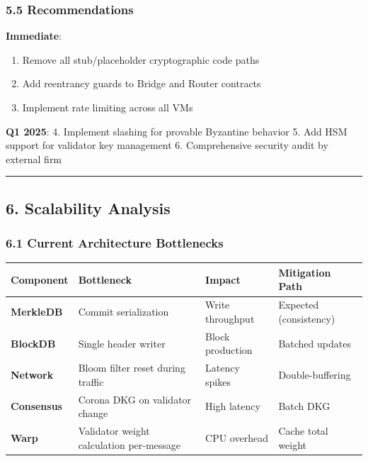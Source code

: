 \documentclass[
]{article}
\newcounter{none} %
\providecommand{\tightlist}{%
  \setlength{\itemsep}{0pt}\setlength{\parskip}{0pt}}
\begin{document}
\subsubsection{5.5 Recommendations}\label{55-recommendations}

\textbf{Immediate}:

\begin{enumerate}
\def\labelenumi{\arabic{enumi}.}
\tightlist
\item
  Remove all stub/placeholder cryptographic code paths
\item
  Add reentrancy guards to Bridge and Router contracts
\item
  Implement rate limiting across all VMs
\end{enumerate}

\textbf{Q1 2025}: 4. Implement slashing for provable Byzantine behavior
5. Add HSM support for validator key management 6. Comprehensive
security audit by external firm

\begin{center}\rule{0.5\linewidth}{0.5pt}\end{center}

\subsection{6. Scalability Analysis}\label{6-scalability-analysis}

\subsubsection{6.1 Current Architecture
Bottlenecks}\label{61-current-architecture-bottlenecks}

{\def\LTcaptype{none} %
\begin{longtable}[]{@{}llll@{}}
\toprule\noalign{}
Component & Bottleneck & Impact & Mitigation Path \\
\midrule\noalign{}
\endhead
\bottomrule\noalign{}
\endlastfoot
\textbf{MerkleDB} & Commit serialization & Write throughput & Expected
(consistency) \\
\textbf{BlockDB} & Single header writer & Block production & Batched
updates \\
\textbf{Network} & Bloom filter reset during traffic & Latency spikes &
Double-buffering \\
\textbf{Consensus} & Corona DKG on validator change & High latency &
Batch DKG \\
\textbf{Warp} & Validator weight calculation per-message & CPU overhead
& Cache total weight \\
\end{longtable}
}
\end{document}
